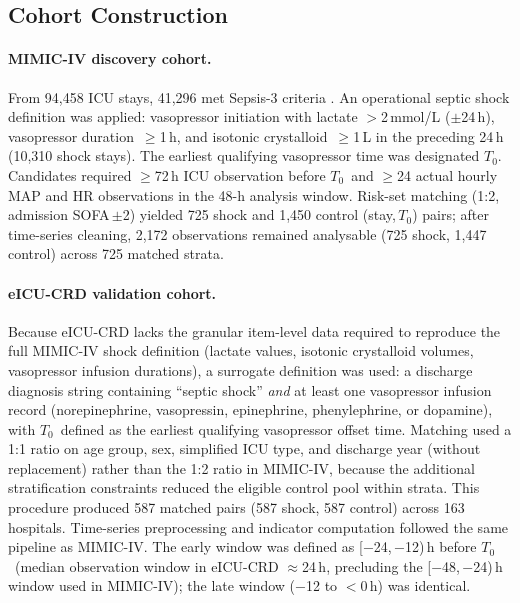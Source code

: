 \documentclass[12pt,a4paper]{article}
\newcommand{\Tzero}{$T_0$}
\begin{document}
\subsection{Cohort Construction}
\label{sec:cohort}

\paragraph{MIMIC-IV discovery cohort.}
From 94,458 ICU stays, 41,296 met Sepsis-3 criteria \citep{singer2016}.
An operational septic shock definition was applied: vasopressor initiation
with lactate $>$2\,mmol/L ($\pm$24\,h), vasopressor duration~$\geq$1\,h,
and isotonic crystalloid~$\geq$1\,L in the preceding 24\,h
(10,310 shock stays).
The earliest qualifying vasopressor time was designated \Tzero.
Candidates required $\geq$72\,h ICU observation before \Tzero\ and
$\geq$24 actual hourly MAP and HR observations in the 48-h analysis window.
Risk-set matching (1:2, admission SOFA\,$\pm$2) yielded 725 shock
and 1,450 control (stay,\,\Tzero) pairs; after time-series cleaning,
2,172 observations remained analysable (725 shock, 1,447 control) across
725 matched strata.

\paragraph{eICU-CRD validation cohort.}
Because eICU-CRD lacks the granular item-level data required to
reproduce the full MIMIC-IV shock definition (lactate values,
isotonic crystalloid volumes, vasopressor infusion durations),
a surrogate definition was used: a discharge diagnosis string
containing ``septic shock'' \emph{and} at least one vasopressor
infusion record (norepinephrine, vasopressin, epinephrine,
phenylephrine, or dopamine), with \Tzero\ defined as the
earliest qualifying vasopressor offset time.
Matching used a 1:1 ratio on age group, sex, simplified ICU type,
and discharge year (without replacement) rather than the 1:2 ratio
in MIMIC-IV, because the additional stratification constraints
reduced the eligible control pool within strata.
This procedure produced 587 matched pairs (587 shock, 587 control)
across 163 hospitals.
Time-series preprocessing and indicator computation followed the same
pipeline as MIMIC-IV.
The early window was defined as [$-$24,\,$-$12)\,h before \Tzero\
(median observation window in eICU-CRD $\approx$24\,h, precluding the
[$-$48,\,$-$24)\,h window used in MIMIC-IV); the late window
($-$12 to $<$0\,h) was identical.
\end{document}
